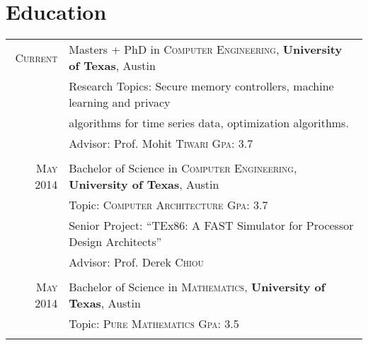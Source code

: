 \documentclass[a4paper,10pt, margin=2in]{article}
\begin{document}
\section{Education}
\begin{tabular}{rl}
 \textsc{Current} & Masters + PhD in \textsc{Computer Engineering}, \textbf{University of Texas}, Austin\\
& Research Topics: Secure memory controllers, machine learning and privacy\\
& algorithms for time series data, optimization algorithms.\\
& {\small Advisor: Prof. Mohit \textsc{Tiwari}} \hfill {\normalsize \textsc{Gpa}: 3.7~~~~~}\\\\
 \textsc{May} 2014 & Bachelor of Science in \textsc{Computer Engineering}, \textbf{University of Texas}, Austin\\
& Topic: \textsc{Computer Architecture} {\hfill \normalsize \textsc{Gpa}: 3.7~~~~} \\
& Senior Project: ``TEx86: A FAST Simulator for Processor Design Architects'' \\
& {\small Advisor: Prof. Derek \textsc{Chiou}}\\\\
 \textsc{May} 2014 & Bachelor of Science in \textsc{Mathematics}, \textbf{University of Texas}, Austin\\
& Topic: \textsc{Pure Mathematics} {\hfill \normalsize \textsc{Gpa}: 3.5~~~~}\\\\
\end{tabular}

\end{document}
